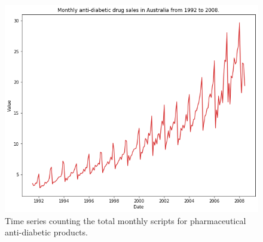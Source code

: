 %
%

\begin{figure}[htb]
	\centering
	\includegraphics[width=0.7\linewidth]{figures/drug_dataset.png}
	\caption{Time series counting the total monthly scripts for pharmaceutical anti-diabetic products.}
	\label{fig:drug_dataset}
\end{figure}
    
